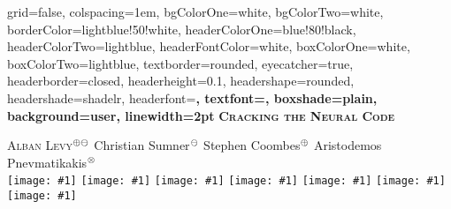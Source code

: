 \documentclass[paperwidth=75cm,paperheight=116.18cm,fontscale=0.40]{baposter}
\def\computer{/Users/pmxal9/}
\def\computer{/Users/pmaal/}
\edef\drop{\computer Dropbox/}
\edef\logos{\drop LogoNoBackground/}
\edef\logoNotts{\logos  notts.png}
\edef\logoIHR{\logos ihr_3.png}
\edef\logoNETT{\logos NETT.png}
\edef\logoPerso{\logos Logo.png}
\edef\logoRxPz{\logos RxPz.png}
\edef\logoEC{\logos EC.png}
\edef\logoMCA{\logos MCA.png}
\newcounter{counter}
\newcommand*\circled[1]{\tikz[baseline=(char.base)]{%
            \node[shape=circle,draw,inner sep=2pt] (char) {#1};}\,\,}
\newcommand\includelogo[1]{\texttt{[image: \#1]}}
\newcommand\includelogospace[1]{\includelogo{#1}\hspace{18mm}}
\newcommand\titlelogos{%
	\includelogospace{\logoNotts} 
	\includelogospace{\logoIHR} 
 	\includelogospace{\logoPerso} 
 	\includelogospace{\logoRxPz} 
	\includelogospace{\logoNETT}
	\includelogospace{\logoMCA} 
	\includelogo{\logoEC}
}
\begin{document}
 \begin{poster}%
  {
  grid=false,
  colspacing=1em,
  bgColorOne=white,
  bgColorTwo=white,
  borderColor=lightblue!50!white,
  headerColorOne=blue!80!black, 
  headerColorTwo=lightblue,
  headerFontColor=white,
  boxColorOne=white,
  boxColorTwo=lightblue,
  textborder=rounded, 
  eyecatcher=true,
  headerborder=closed,
  headerheight=0.1\textheight,
  headershape=rounded, 
  headershade=shadelr,
  headerfont=\Large\bf\textsc, 
  textfont={\setlength{\parindent}{1em}},
  boxshade=plain,
  background=user,
  linewidth=2pt
  }%
{}%
{%
\bf\textsc{\Huge \textcolor{colorTitle}{Cracking\; the\; Neural\; Code}}
}%
{%
\textcolor{colorTitle}{
	\Large \textsc{Alban Levy}${}^{\oplus\ominus}$  \;\;
	Christian Sumner${}^\ominus$ \;\;
	Stephen Coombes${}^\oplus$ \;\;
	Aristodemos Pnevmatikakis${}^\otimes$
}
	\\[6mm]\titlelogos
}{}  


\newcommand\bul{\noindent$\bullet$\hspace{1mm}}

\newcommand*\circld[1]{\tikz[baseline=(char.base)]{%
            \node[shape=circle,draw,inner sep=2pt] (char) {#1};}\,\,}
        
\setcounter{counterBlock}{1} 
\newcommand\counterIncrem{\raisebox{0.15em}{\small\circld{\arabic{counterBlock}}\addtocounter{counterBlock}{1}}}

\newcommand\ccircled[1]{\small{\circled{#1}}}

\newlength\blocLeft
\setlength\blocLeft{27.0cm}
\newlength\spaceItem
\setlength\spaceItem{-4.6mm}

\newlength\cwidth
\newlength\cheight
\setlength\cwidth{9.0cm} 
\setlength\cheight{5cm} 




\end{poster}
\end{document}

